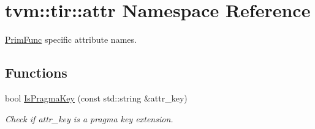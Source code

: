 \hypertarget{namespacetvm_1_1tir_1_1attr}{}\section{tvm\+:\+:tir\+:\+:attr Namespace Reference}
\label{namespacetvm_1_1tir_1_1attr}


\hyperlink{classtvm_1_1tir_1_1PrimFunc}{Prim\+Func} specific attribute names.  


\subsection*{Functions}
\begin{DoxyCompactItemize}
\item 
bool \hyperlink{namespacetvm_1_1tir_1_1attr_a385e883a7cecc309d063786e5fdf2c4b}{Is\+Pragma\+Key} (const std\+::string \&attr\+\_\+key)
\begin{DoxyCompactList}\small\item\em Check if attr\+\_\+key is a pragma key extension. \end{DoxyCompactList}\end{DoxyCompactItemize}

